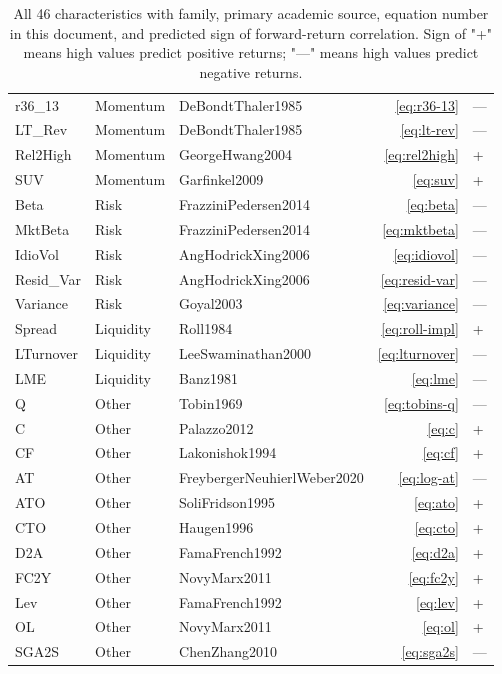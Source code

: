 \begin{table}[!ht]
\begin{tabular}{lllrl}
r36\_13 & Momentum & DeBondtThaler1985 & \ref{eq:r36-13} & --- \\
LT\_Rev & Momentum & DeBondtThaler1985 & \ref{eq:lt-rev} & --- \\
Rel2High & Momentum & GeorgeHwang2004 & \ref{eq:rel2high} & + \\
SUV & Momentum & Garfinkel2009 & \ref{eq:suv} & + \\
\midrule
Beta & Risk & FrazziniPedersen2014 & \ref{eq:beta} & --- \\
MktBeta & Risk & FrazziniPedersen2014 & \ref{eq:mktbeta} & --- \\
IdioVol & Risk & AngHodrickXing2006 & \ref{eq:idiovol} & --- \\
Resid\_Var & Risk & AngHodrickXing2006 & \ref{eq:resid-var} & --- \\
Variance & Risk & Goyal2003 & \ref{eq:variance} & --- \\
\midrule
Spread & Liquidity & Roll1984 & \ref{eq:roll-impl} & + \\
LTurnover & Liquidity & LeeSwaminathan2000 & \ref{eq:lturnover} & --- \\
LME & Liquidity & Banz1981 & \ref{eq:lme} & --- \\
\midrule
Q & Other & Tobin1969 & \ref{eq:tobins-q} & --- \\
C & Other & Palazzo2012 & \ref{eq:c} & + \\
CF & Other & Lakonishok1994 & \ref{eq:cf} & + \\
AT & Other & FreybergerNeuhierlWeber2020 & \ref{eq:log-at} & --- \\
ATO & Other & SoliFridson1995 & \ref{eq:ato} & + \\
CTO & Other & Haugen1996 & \ref{eq:cto} & + \\
D2A & Other & FamaFrench1992 & \ref{eq:d2a} & + \\
FC2Y & Other & NovyMarx2011 & \ref{eq:fc2y} & + \\
Lev & Other & FamaFrench1992 & \ref{eq:lev} & + \\
OL & Other & NovyMarx2011 & \ref{eq:ol} & + \\
SGA2S & Other & ChenZhang2010 & \ref{eq:sga2s} & --- \\
\bottomrule
\end{tabular}
\caption{All 46 characteristics with family, primary academic source,
equation number in this document, and predicted sign of forward-return
correlation. Sign of "+" means high values predict positive returns;
"---" means high values predict negative returns.}
\label{tab:char-summary}
\end{table}

